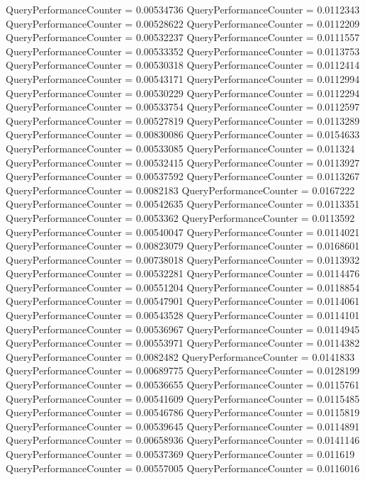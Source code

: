 \documentclass[9pt]{article}
\theoremstyle{plain}
\theoremstyle{definition}
\theoremstyle{remark}
\numberwithin{equation}{section}
\begin{document}
QueryPerformanceCounter  =  0.00534736
QueryPerformanceCounter  =  0.0112343
QueryPerformanceCounter  =  0.00528622
QueryPerformanceCounter  =  0.0112209
QueryPerformanceCounter  =  0.00532237
QueryPerformanceCounter  =  0.0111557
QueryPerformanceCounter  =  0.00533352
QueryPerformanceCounter  =  0.0113753
QueryPerformanceCounter  =  0.00530318
QueryPerformanceCounter  =  0.0112414
QueryPerformanceCounter  =  0.00543171
QueryPerformanceCounter  =  0.0112994
QueryPerformanceCounter  =  0.00530229
QueryPerformanceCounter  =  0.0112294
QueryPerformanceCounter  =  0.00533754
QueryPerformanceCounter  =  0.0112597
QueryPerformanceCounter  =  0.00527819
QueryPerformanceCounter  =  0.0113289
QueryPerformanceCounter  =  0.00830086
QueryPerformanceCounter  =  0.0154633
QueryPerformanceCounter  =  0.00533085
QueryPerformanceCounter  =  0.011324
QueryPerformanceCounter  =  0.00532415
QueryPerformanceCounter  =  0.0113927
QueryPerformanceCounter  =  0.00537592
QueryPerformanceCounter  =  0.0113267
QueryPerformanceCounter  =  0.0082183
QueryPerformanceCounter  =  0.0167222
QueryPerformanceCounter  =  0.00542635
QueryPerformanceCounter  =  0.0113351
QueryPerformanceCounter  =  0.0053362
QueryPerformanceCounter  =  0.0113592
QueryPerformanceCounter  =  0.00540047
QueryPerformanceCounter  =  0.0114021
QueryPerformanceCounter  =  0.00823079
QueryPerformanceCounter  =  0.0168601
QueryPerformanceCounter  =  0.00738018
QueryPerformanceCounter  =  0.0113932
QueryPerformanceCounter  =  0.00532281
QueryPerformanceCounter  =  0.0114476
QueryPerformanceCounter  =  0.00551204
QueryPerformanceCounter  =  0.0118854
QueryPerformanceCounter  =  0.00547901
QueryPerformanceCounter  =  0.0114061
QueryPerformanceCounter  =  0.00543528
QueryPerformanceCounter  =  0.0114101
QueryPerformanceCounter  =  0.00536967
QueryPerformanceCounter  =  0.0114945
QueryPerformanceCounter  =  0.00553971
QueryPerformanceCounter  =  0.0114382
QueryPerformanceCounter  =  0.0082482
QueryPerformanceCounter  =  0.0141833
QueryPerformanceCounter  =  0.00689775
QueryPerformanceCounter  =  0.0128199
QueryPerformanceCounter  =  0.00536655
QueryPerformanceCounter  =  0.0115761
QueryPerformanceCounter  =  0.00541609
QueryPerformanceCounter  =  0.0115485
QueryPerformanceCounter  =  0.00546786
QueryPerformanceCounter  =  0.0115819
QueryPerformanceCounter  =  0.00539645
QueryPerformanceCounter  =  0.0114891
QueryPerformanceCounter  =  0.00658936
QueryPerformanceCounter  =  0.0141146
QueryPerformanceCounter  =  0.00537369
QueryPerformanceCounter  =  0.011619
QueryPerformanceCounter  =  0.00557005
QueryPerformanceCounter  =  0.0116016
\end{document}
